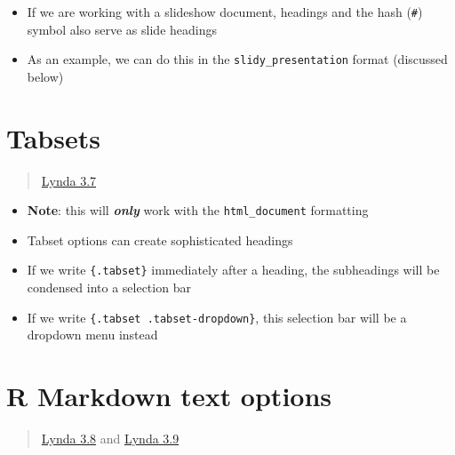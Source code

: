 \documentclass[]{article}
\providecommand{\tightlist}{%
  \setlength{\itemsep}{0pt}\setlength{\parskip}{0pt}}
\begin{document}
\begin{itemize}
\tightlist
\item
  If we are working with a slideshow document, headings and the hash
  (\texttt{\#}) symbol also serve as slide headings
\item
  As an example, we can do this in the \texttt{slidy\_presentation}
  format (discussed below)
\end{itemize}

\hypertarget{tabsets}{%
\section{Tabsets}\label{tabsets}}

\begin{quote}
\href{https://www.lynda.com/RStudio-tutorials/Tabbed-sections-R-Markdown-HTML-reports/699348/2700136-4.html?srchtrk=index\%3a1\%0alinktypeid\%3a2\%0aq\%3ar+markdown\%0apage\%3a1\%0as\%3arelevance\%0asa\%3atrue\%0aproducttypeid\%3a2}{Lynda
3.7}
\end{quote}

\begin{itemize}
\tightlist
\item
  \textbf{Note}: this will \textbf{\emph{only}} work with the
  \texttt{html\_document} formatting
\item
  Tabset options can create sophisticated headings
\item
  If we write \texttt{\{.tabset\}} immediately after a heading, the
  subheadings will be condensed into a selection bar
\end{itemize}

\begin{itemize}
\tightlist
\item
  If we write \texttt{\{.tabset\ .tabset-dropdown\}}, this selection bar
  will be a dropdown menu instead
\end{itemize}

\hypertarget{r-markdown-text-options}{%
\section{R Markdown text options}\label{r-markdown-text-options}}

\begin{quote}
\href{https://www.lynda.com/RStudio-tutorials/Formatting-text-R-Markdown-files/699348/2700137-4.html?srchtrk=index\%3a1\%0alinktypeid\%3a2\%0aq\%3ar+markdown\%0apage\%3a1\%0as\%3arelevance\%0asa\%3atrue\%0aproducttypeid\%3a2}{Lynda
3.8} and
\href{https://www.lynda.com/RStudio-tutorials/Bullets-lists-R-Markdown/699348/2801132-4.html?srchtrk=index\%3a1\%0alinktypeid\%3a2\%0aq\%3ar+markdown\%0apage\%3a1\%0as\%3arelevance\%0asa\%3atrue\%0aproducttypeid\%3a2}{Lynda
3.9}
\end{quote}
\end{document}
